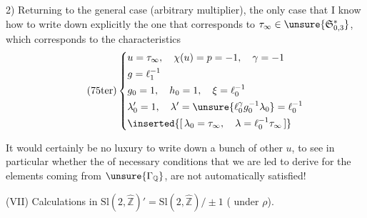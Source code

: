 2) Returning to the general case (arbitrary multiplier), the only case that I know how to write down explicitly
  the one that corresponds to
$\tau_\infty\in\unsure{\mathfrak S_{0,3}^{*}}$,
which corresponds to the characteristics
\[
\tag{75ter}
\left\{
\begin{aligned}
&u=\tau_\infty,\quad\chi(u)=p=-1,\quad\gamma=-1\\
&g=\ell_1^{-1}\\
&g_0=1,\quad h_0=1,\quad\xi=\ell_0^{-1}\\
&\lambda'_0=1,\quad\lambda'=\unsure{\ell_0^\gamma g_0^{-1}\lambda_0}=\ell_0^{-1}\\
&\inserted{[\,\lambda_0=\tau_\infty,\quad\lambda=\ell_0^{-1}\tau_\infty\,]}
\end{aligned}
\right.
\]

It would certainly be no luxury  to write down a bunch of other $u$, to see in particular whether the  of necessary conditions that we are led to derive for the elements coming from $\unsure{\Gamma_{\mathbb Q}}$, are not automatically satisfied!


(VII) Calculations in $\mathrm{Sl}(2,\widehat{\mathbb Z})'=\mathrm{Sl}(2,\widehat{\mathbb Z})/\pm1$
( under $\rho$).


